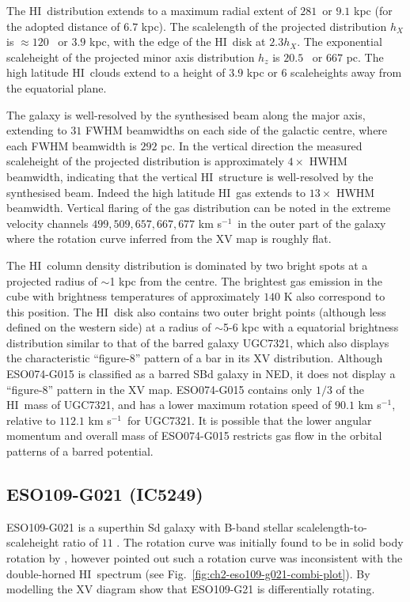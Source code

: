 \documentclass[traditabstract]{aa} %
\newcommand\HI{H{\small I}}
\newcommand\kms{km s$^{-1}$}
\begin{document}
The \HI\ distribution extends to a maximum radial extent of
$281$\arcsec\ or $9.1$ kpc (for the adopted distance of $6.7$ kpc). The
scalelength of the projected distribution $h_X$ is $\approx120$
\arcsec\ or $3.9$ kpc, with the edge of the \HI\ disk at $2.3h_X$. The
exponential
scaleheight of the projected minor axis distribution $h_z$ is $20.5$
\arcsec\ or $667$ pc. The high latitude \HI\ clouds extend to a
height of $3.9$ kpc or $6$ scaleheights away from the equatorial plane.

The galaxy is well-resolved by the synthesised beam along the major
axis, extending to $31$ FWHM beamwidths on each side of the galactic
centre, where each FWHM beamwidth is $292$ pc. In the vertical
direction the measured scaleheight of the projected distribution is
approximately $4 \times$ HWHM beamwidth, indicating that the vertical
\HI\ structure is well-resolved by the synthesised beam. Indeed the
high latitude \HI\ gas extends to $13 \times$ HWHM beamwidth. Vertical
flaring of the gas distribution can be noted in the extreme velocity
channels $499, 509, 657, 667, 677$ \kms\  in the outer part of the
galaxy where the rotation curve inferred from the XV map is roughly
flat.

The \HI\ column density distribution is dominated by two bright spots
at a projected radius of $\sim$1 kpc from the centre. The brightest
gas emission in the cube with brightness temperatures of approximately
$140$ K also correspond to this position. The \HI\ disk also contains
two outer bright points (although less defined on the western side) at
a radius of $\sim$5-6 kpc with a equatorial brightness
distribution similar to that of the barred galaxy UGC7321, which also
displays the characteristic ``figure-8'' pattern of a bar in its
XV distribution.  Although ESO074-G015 is classified as a barred
SBd galaxy in NED, it does not display a ``figure-8'' pattern in
the XV map. ESO074-G015 contains only $1/3$ of the \HI\ mass of
UGC7321, and has a lower maximum rotation speed of $90.1$ \kms,
relative to $112.1$ \kms\ for UGC7321. It is possible that the lower angular
momentum and overall mass of ESO074-G015 restricts gas flow in
the orbital patterns of a barred potential.



\subsection{ESO109-G021 (IC5249)}

ESO109-G021 is a superthin Sd galaxy with B-band stellar
scalelength-to-scaleheight ratio of $11$ \citep{vdkjvkf2001}. The
rotation curve was initially found to be in solid body rotation by
\citet{abeetal1999}, however \citet{vdkjvkf2001} pointed out such a
rotation curve was inconsistent with the double-horned \HI\ spectrum
(see Fig.~\ref{fig:ch2-eso109-g021-combi-plot}). By modelling the XV
diagram \citet{vdkjvkf2001} show that ESO109-G21 is differentially
rotating.
\end{document}
